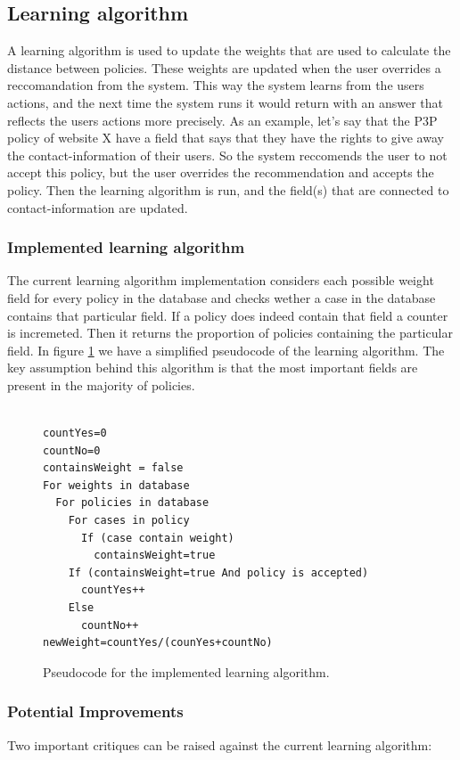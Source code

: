 \subsection{Learning algorithm}\label{learnAlgos}
A learning algorithm is used to update the weights that are used to calculate the distance between policies. These weights are updated when the user overrides a reccomandation from the system. This way the system learns from the users actions, and the next time the system runs it would return with an answer that reflects the users actions more precisely. As an example, let's say that the P3P policy of website X have a field that says that they have the rights to give away the contact-information of their users. So the system reccomends the user to not accept this policy, but the user overrides the recommendation and accepts the policy. Then the learning algorithm is run, and the field(s) that are connected to contact-information are updated. 

\subsubsection{Implemented learning algorithm}
The current learning algorithm implementation considers each possible weight field for every policy in the database and checks wether a case in the database contains that particular field. If a policy does indeed contain that field a counter is incremeted. Then it returns the proportion of policies containing the particular field. In figure \ref{pseudoLearnAlg} we have a simplified pseudocode of the learning algorithm. The key assumption behind this algorithm is that the most important fields are present in the majority of policies.
 
\begin{figure}[htpb]

\begin{verbatim}

countYes=0
countNo=0
containsWeight = false
For weights in database
  For policies in database
    For cases in policy
      If (case contain weight)
        containsWeight=true
    If (containsWeight=true And policy is accepted)
      countYes++
    Else
      countNo++
newWeight=countYes/(counYes+countNo)	
\end{verbatim}
\caption{Pseudocode for the implemented learning algorithm.}
\label{pseudoLearnAlg}
\end{figure}

\subsubsection{Potential Improvements}
Two important critiques can be raised against the current learning algorithm:

